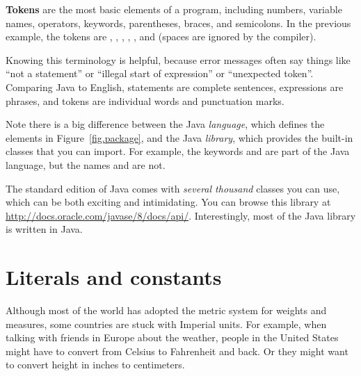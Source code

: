 {\bf Tokens} are the most basic elements of a program, including numbers, variable names, operators, keywords, parentheses, braces, and semicolons.
In the previous example, the tokens are , \java{=}, , \java{/}, , and \java{;} (spaces are ignored by the compiler).


Knowing this terminology is helpful, because error messages often say things like ``not a statement'' or ``illegal start of expression'' or ``unexpected token''.
Comparing Java to English, statements are complete sentences, expressions are phrases, and tokens are individual words and punctuation marks.

Note there is a big difference between the Java {\em language}, which defines the elements in Figure~\ref{fig.package}, and the Java {\em library}, which provides the built-in classes that you can import.
For example, the keywords  and  are part of the Java language, but the names  and  are not.

The standard edition of Java comes with {\em several thousand} classes you can use, which can be both exciting and intimidating.
You can browse this library at \url{http://docs.oracle.com/javase/8/docs/api/}.
Interestingly, most of the Java library is written in Java.


\section{Literals and constants}

Although most of the world has adopted the metric system for weights and measures, some countries are stuck with Imperial units.
For example, when talking with friends in Europe about the weather, people in the United States might have to convert from Celsius to Fahrenheit and back.
Or they might want to convert height in inches to centimeters.


